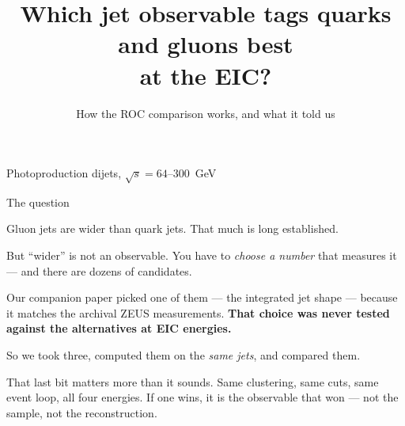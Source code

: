 \documentclass[aspectratio=169,10pt]{beamer}
\title{\bfseries Which jet observable tags quarks and gluons best\\at the EIC?}
\subtitle{How the ROC comparison works, and what it told us}
\author{}
\date{}
\begin{document}
\begin{frame}[plain]
  \titlepage
  \vspace{-1.5cm}
  \centering\small Photoproduction dijets, $\sqrt{s} = 64$--$300$~GeV
\end{frame}

\begin{frame}{The question}

Gluon jets are wider than quark jets. That much is long established.

\vspace{0.5em}
But ``wider'' is not an observable. You have to \emph{choose a number} that
measures it --- and there are dozens of candidates.

\vspace{1em}
Our companion paper picked one of them --- the integrated jet shape --- because
it matches the archival ZEUS measurements. \textbf{That choice was never tested
against the alternatives at EIC energies.}

\vspace{1em}
So we took three, computed them on the \emph{same jets}, and compared them.

\vspace{1.5em}
\footnotesize
That last bit matters more than it sounds. Same clustering, same cuts, same
event loop, all four energies. If one wins, it is the observable that won ---
not the sample, not the reconstruction.

\end{frame}
\end{document}
